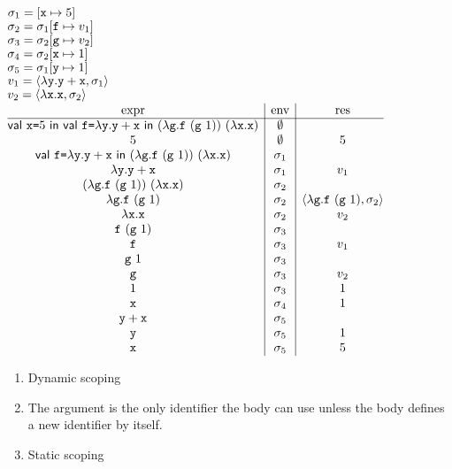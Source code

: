 $\sigma_1=[\texttt{x}\mapsto5]$\\
$\sigma_2=\sigma_1[\texttt{f}\mapsto v_1]$\\
$\sigma_3=\sigma_2[\texttt{g}\mapsto v_2]$\\
$\sigma_4=\sigma_2[\texttt{x}\mapsto1]$\\
$\sigma_5=\sigma_1[\texttt{y}\mapsto1]$\\
$v_1=\langle\lambda\texttt{y}.\texttt{y}+\texttt{x},\sigma_1\rangle$\\
$v_2=\langle\lambda\texttt{x}.\texttt{x},\sigma_2\rangle$\\
$
\begin{array}{@{}c|c|c@{}}
  \text{expr} & \text{env} & \text{res} \\\hline
\ebind{\cx}{5}{
   \ebind{\code{f}}{\efun{\cy}{\eadd{\cy}{\cx}}}{
     \eapp{(\efun{\code{g}}{\eapp{\code{f}}{(\eapp{\code{g}}{1})}})}
       {(\efun{\cx}{\cx})}}} & \emptyset & \\
5 & \emptyset & 5 \\
\ebind{\code{f}}{\efun{\cy}{\eadd{\cy}{\cx}}}{
  \eapp{(\efun{\code{g}}{\eapp{\code{f}}{(\eapp{\code{g}}{1})}})}
    {(\efun{\cx}{\cx})}} & \sigma_1 & \\
\efun{\cy}{\eadd{\cy}{\cx}} & \sigma_1 & v_1 \\
\eapp{(\efun{\code{g}}{\eapp{\code{f}}{(\eapp{\code{g}}{1})}})}{(\efun{\cx}{\cx})} & \sigma_2 & \\
\efun{\code{g}}{\eapp{\code{f}}{(\eapp{\code{g}}{1})}} & \sigma_2 &
\clov{\code{g}}{\eapp{\code{f}}{(\eapp{\code{g}}{1})}}{\sigma_2} \\
\efun{\cx}{\cx} & \sigma_2 & v_2 \\
\eapp{\code{f}}{(\eapp{\code{g}}{1})} & \sigma_3 & \\
\cf & \sigma_3 & v_1 \\
\eapp{\code{g}}{1} & \sigma_3 \\
\code{g} & \sigma_3 & v_2 \\
1 & \sigma_3 & 1 \\
\cx & \sigma_4 & 1 \\
\eadd{\cy}{\cx} & \sigma_5 \\
\cy & \sigma_5 & 1 \\
\cx & \sigma_5 & 5 \\
\end{array}
$
\\

\textbf{}
\begin{enumerate}
  \item Dynamic scoping
  \item The argument is the only identifier the body can use unless the body defines a new identifier by itself.
  \item Static scoping
\end{enumerate}

